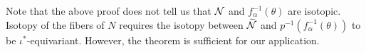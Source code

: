 

  Note that the above proof does not tell us that $\mathcal{N}$ and $f_{\alpha}^{-1}(\theta)$ are isotopic.  Isotopy of the fibers of $N$ requires the isotopy between $\widetilde{\mathcal{N}}$ and $p^{-1}(f^{-1}_\alpha(\theta))$ to be $\iota^{\ast}$-equivariant.  However, the theorem is sufficient for our application.


